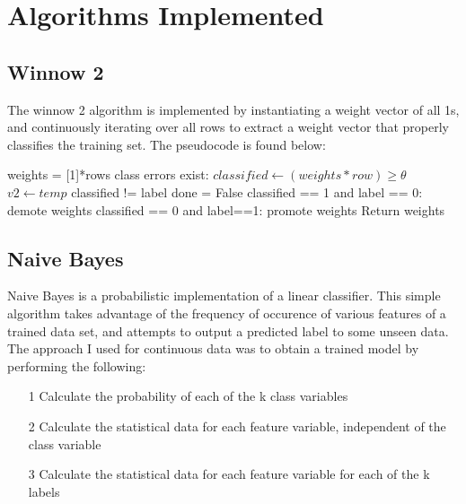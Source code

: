 \documentclass[11pt]{article}
\begin{document}
\section{Algorithms Implemented}

\subsection{Winnow 2} 

The winnow 2 algorithm is implemented by instantiating a weight vector of all 1s, and continuously iterating over all rows to extract a weight vector that properly classifies the training set. The pseudocode is found below:

\begin{codebox}

\li weights = [1]*rows
\li \While class errors exist:
\li 	\Then
			$classified \gets (weights * row) \geq \theta $
\li			$v2 \gets temp$
\li \If classified != label
\li 	\Then 
			done = False
\li 	\If classified == 1 and label == 0:
\li 		\Then
				demote weights
\li 	\ElseIf classified == 0 and label==1:		\li 		\Then
				promote weights		 			
	 	\End
	 \End
\End
\li Return weights
\li		\End
\end{codebox}



\subsection{Naive Bayes} 
Naive Bayes is a probabilistic implementation of a linear classifier. This simple algorithm takes advantage of the frequency of occurence of various features of a trained data set, and attempts to output a predicted label to some unseen data. The approach I used for continuous data was to obtain a trained model by performing the following:
\begin{itemize}
\item[1] Calculate the probability of each of the k class variables
\item[2] Calculate the statistical data for each feature variable, independent of the class variable
\item[3] Calculate the statistical data for each feature variable for each of the k labels
\end{itemize}
\end{document}
